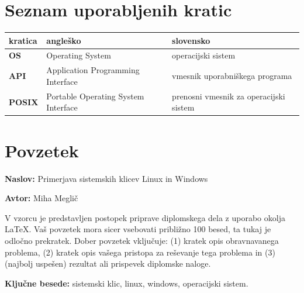 \documentclass[a4paper,12pt,openright]{book}
\newcommand{\ttitle}{Primerjava sistemskih klicev Linux in Windows}
\newcommand{\tauthor}{Miha Meglič}
\newcommand{\tkeywords}{sistemski klic, linux, windows, operacijski sistem}
\newcommand{\clearemptydoublepage}{\newpage{\pagestyle{empty}\cleardoublepage}}
\begin{document}
\pagestyle{empty}
\def\thepage{}%
\tableofcontents{}


\clearemptydoublepage


\chapter*{Seznam uporabljenih kratic}

\noindent\begin{tabular}{p{}|p{}|p{}}    %
{\bf kratica}	& {\bf angleško}							& {\bf slovensko} \\ \hline
{\bf OS}		& Operating System							& operacijski sistem \\
{\bf API}		& Application Programming Interface			& vmesnik uporabniškega programa \\
{\bf POSIX}		& Portable Operating System Interface		& prenosni vmesnik za operacijski sistem \\
\end{tabular}


\clearemptydoublepage

\chapter*{Povzetek}

\noindent\textbf{Naslov:} \ttitle
\bigskip

\noindent\textbf{Avtor:} \tauthor
\bigskip

\noindent V vzorcu je predstavljen postopek priprave diplomskega dela z uporabo okolja \LaTeX. Vaš povzetek mora sicer vsebovati približno 100 besed, ta tukaj je odločno prekratek.
Dober povzetek vključuje: (1) kratek opis obravnavanega problema, (2) kratek opis vašega pristopa za reševanje tega problema in (3) (najbolj uspešen) rezultat ali prispevek diplomske naloge.

\bigskip

\noindent\textbf{Ključne besede:} \tkeywords.
\clearemptydoublepage

\end{document}
